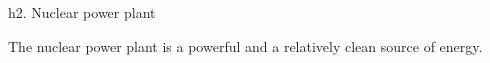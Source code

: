 h2. Nuclear power plant

The nuclear power plant is a powerful and a relatively clean source of energy.
